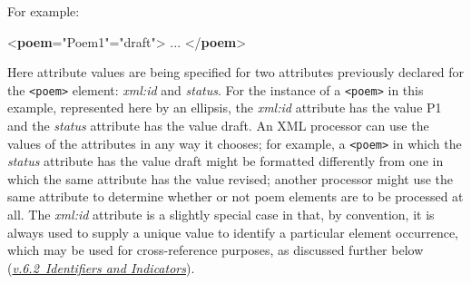 For example: \par\bgroup\exampleFont \begin{shaded}\noindent\mbox{}{<\textbf{poem}\hspace*{1em}{xml:id}="{Poem1}"\hspace*{1em}{status}="{draft}">} ... {</\textbf{poem}>}\end{shaded}\egroup\par \noindent  Here attribute values are being specified for two attributes previously declared for the \texttt{<poem>} element: {\itshape xml:id} and {\itshape status}. For the instance of a \texttt{<poem>} in this example, represented here by an ellipsis, the {\itshape xml:id} attribute has the value P1 and the {\itshape status} attribute has the value draft. An XML processor can use the values of the attributes in any way it chooses; for example, a \texttt{<poem>} in which the {\itshape status} attribute has the value draft might be formatted differently from one in which the same attribute has the value revised; another processor might use the same attribute to determine whether or not poem elements are to be processed at all. The {\itshape xml:id} attribute is a slightly special case in that, by convention, it is always used to supply a unique value to identify a particular element occurrence, which may be used for cross-reference purposes, as discussed further below (\textit{\hyperref[SG-id]{v.6.2\ Identifiers and Indicators}}).
